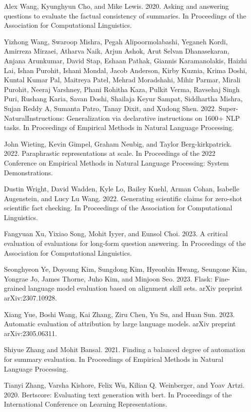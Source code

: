 \documentclass[11pt,UTF8,fontset=fandol]{ctexart}
\begin{document}
Alex Wang, Kyunghyun Cho, and Mike Lewis. 2020. Asking and answering questions to evaluate the factual consistency of summaries. In Proceedings of the Association for Computational Linguistics.

Yizhong Wang, Swaroop Mishra, Pegah Alipoormolabashi, Yeganeh Kordi, Amirreza Mirzaei, Atharva Naik, Arjun Ashok, Arut Selvan Dhanasekaran, Anjana Arunkumar, David Stap, Eshaan Pathak, Giannis Karamanolakis, Haizhi Lai, Ishan Purohit, Ishani Mondal, Jacob Anderson, Kirby Kuznia, Krima Doshi, Kuntal Kumar Pal, Maitreya Patel, Mehrad Moradshahi, Mihir Parmar, Mirali Purohit, Neeraj Varshney, Phani Rohitha Kaza, Pulkit Verma, Ravsehaj Singh Puri, Rushang Karia, Savan Doshi, Shailaja Keyur Sampat, Siddhartha Mishra, Sujan Reddy A, Sumanta Patro, Tanay Dixit, and Xudong Shen. 2022. Super-NaturalInstructions: Generalization via declarative instructions on 1600+ NLP tasks. In Proceedings of Empirical Methods in Natural Language Processing.

John Wieting, Kevin Gimpel, Graham Neubig, and Taylor Berg-kirkpatrick. 2022. Paraphrastic representations at scale. In Proceedings of the 2022 Conference on Empirical Methods in Natural Language Processing: System Demonstrations.

Dustin Wright, David Wadden, Kyle Lo, Bailey Kuehl, Arman Cohan, Isabelle Augenstein, and Lucy Lu Wang. 2022. Generating scientific claims for zero-shot scientific fact checking. In Proceedings of the Association for Computational Linguistics.

Fangyuan Xu, Yixiao Song, Mohit Iyyer, and Eunsol Choi. 2023. A critical evaluation of evaluations for long-form question answering. In Proceedings of the Association for Computational Linguistics.

Seonghyeon Ye, Doyoung Kim, Sungdong Kim, Hyeonbin Hwang, Seungone Kim, Yongrae Jo, James Thorne, Juho Kim, and Minjoon Seo. 2023. Flask: Fine-grained language model evaluation based on alignment skill sets. arXiv preprint arXiv:2307.10928.

Xiang Yue, Boshi Wang, Kai Zhang, Ziru Chen, Yu Su, and Huan Sun. 2023. Automatic evaluation of attribution by large language models. arXiv preprint arXiv:2305.06311.

Shiyue Zhang and Mohit Bansal. 2021. Finding a balanced degree of automation for summary evaluation. In Proceedings of Empirical Methods in Natural Language Processing.

Tianyi Zhang, Varsha Kishore, Felix Wu, Kilian Q. Weinberger, and Yoav Artzi. 2020. Bertscore: Evaluating text generation with bert. In Proceedings of the International Conference on Learning Representations.
\end{document}
